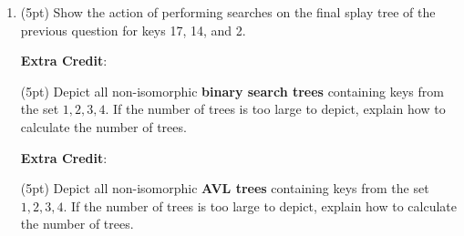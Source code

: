 \documentclass{article}
\newcommand*{\pts}[1]{\addtocounter{points}{#1}(#1pt)}
\newcommand{\ecpts}[1]{\addtocounter{ecpoints}{#1}(#1pt)}
\begin{document}
\begin{spacing}{1.4}
\begin{enumerate}[leftmargin=*]
\vspace{8cm}

\item\label{lastQuestion} \pts{5} Show the action of performing
  searches on the final splay tree of the previous question for keys
  17, 14, and 2.

\newpage

\textbf{Extra Credit}: \ecpts{5} Depict all non-isomorphic \textbf{binary
search trees} containing keys from the set ${1,2,3,4}$.  If the number
of trees is too large to depict, explain how to calculate the number
of trees.

\vspace{12cm}

\textbf{Extra Credit}: \ecpts{5} Depict all non-isomorphic \textbf{AVL trees}
containing keys from the set ${1,2,3,4}$.  If the number of trees is
too large to depict, explain how to calculate the number of trees.


\end{enumerate}
\end{spacing}
\end{document}
